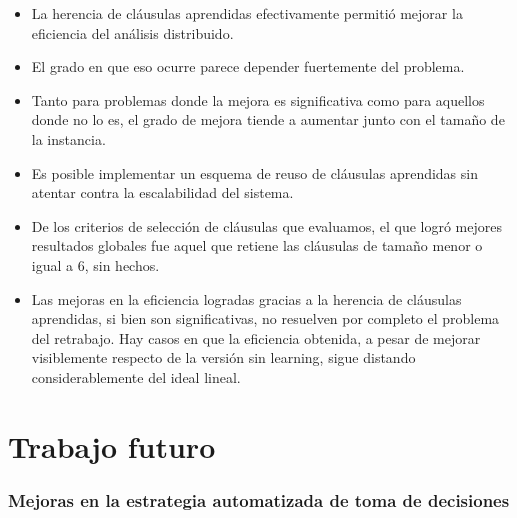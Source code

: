 \begin{itemize}

\item La herencia de cláusulas aprendidas efectivamente permitió mejorar la eficiencia del análisis distribuido.

\item El grado en que eso ocurre parece depender fuertemente del problema.

\item Tanto para problemas donde la mejora es significativa como para aquellos donde no lo es, el grado de mejora tiende a aumentar junto con el tamaño de la instancia.

\item Es posible implementar un esquema de reuso de cláusulas aprendidas sin atentar contra la escalabilidad del sistema.

\item De los criterios de selección de cláusulas que evaluamos, el que logró mejores resultados globales fue aquel que retiene las cláusulas de tamaño menor o igual a 6, sin hechos.

\item Las mejoras en la eficiencia logradas gracias a la herencia de cláusulas aprendidas, si bien son significativas, no resuelven por completo el problema del retrabajo. Hay casos en que la eficiencia obtenida, a pesar de mejorar visiblemente respecto de la versión sin learning, sigue distando considerablemente del ideal lineal.

\end{itemize}







%
%
%
%
%


\section{Trabajo futuro}

\subsubsection{Mejoras en la estrategia automatizada de toma de decisiones}

